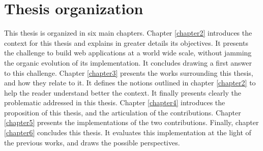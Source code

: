 \section{Thesis organization}

This thesis is organized in six main chapters.
Chapter \ref{chapter2} introduces the context for this thesis and explains in greater details its objectives.
It presents the challenge to build web applications at a world wide scale, without jamming the organic evolution of its implementation.
It concludes drawing a first answer to this challenge.
Chapter \ref{chapter3} presents the works surrounding this thesis, and how they relate to it.
It defines the notions outlined in chapter \ref{chapter2} to help the reader understand better the context.
It finally presents clearly the problematic addressed in this thesis.
Chapter \ref{chapter4} introduces the proposition of this thesis, and the articulation of the contributions.
Chapter \ref{chapter5} presents the implementations of the two contributions.
Finally, chapter \ref{chapter6} concludes this thesis.
It evaluates this implementation at the light of the previous works, and draws the possible perspectives.
